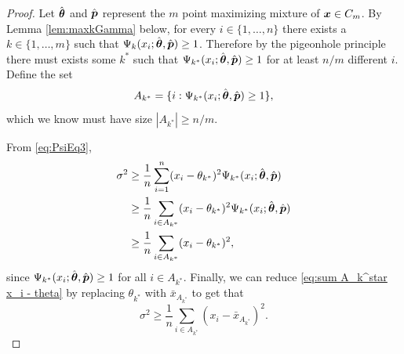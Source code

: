 		\begin{proof}
			Let $\hat{{\bm{{\theta}}}}$ and $\hat{{\bm{{p}}}}$ represent the $m$ point maximizing mixture of ${\bm{{x}}} \in C_m$. By Lemma \ref{lem:maxkGamma} below, for every $i \in \{1, \dots, n\}$ there exists a $k \in \{1, \dots, m\}$ such that $\Psi_{k}(x_i;\hat{{\bm{{\theta}}}},\hat{{\bm{{p}}}}) \geq 1$. Therefore by the pigeonhole principle there must exists some $k^*$ such that $\Psi_{k^*}(x_i;\hat{{\bm{{\theta}}}},\hat{{\bm{{p}}}}) \geq 1$ for at least $n / m$ different $i$. Define the set
			\begin{equation}
			 	A_{k^*} = \{i : \Psi_{k^*}(x_i;\hat{{\bm{{\theta}}}},\hat{{\bm{{p}}}}) \geq 1 \},
			\end{equation}
			which we know must have size $|A_{k^*}| \geq n/m$.


			From \eqref{eq:PsiEq3},
			\begin{align}
				\sigma^2 &\geq \frac{1}{n} \sum_{i=1}^n (x_i - \theta_{k^*})^2 \Psi_{k^*}(x_i; \hat{{\bm{{\theta}}}}, \hat{{\bm{{p}}}})\\ 
					&\geq \frac{1}{n} \sum_{i \in A_{k^*}} (x_i - \theta_{k^*})^2 \Psi_{k^*}(x_i; \hat{{\bm{{\theta}}}}, \hat{{\bm{{p}}}})\\
					&\geq \frac{1}{n} \sum_{i \in A_{k^*}} (x_i - \theta_{k^*})^2,
					\label{eq:sum A_k^star x_i - theta}
			\end{align}
			since $\Psi_{k^*}(x_i;\hat{{\bm{{\theta}}}},\hat{{\bm{{p}}}}) \geq 1$ for all $i \in A_{k^*}$. Finally, we can reduce \eqref{eq:sum A_k^star x_i - theta} by replacing $\theta_{k^*}$ with $\bar{x}_{A_{k^*}}$ to get that
			\begin{equation}
				\sigma^2 \geq \frac{1}{n} \sum_{i \in A_{k^*}} \left(x_i - \bar{x}_{A_{k^*}}\right)^2.
			\end{equation}
		\end{proof}

